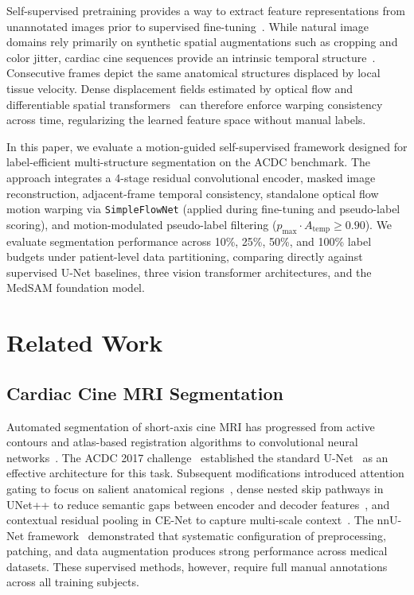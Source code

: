 \documentclass[pdflatex,sn-mathphys]{sn-jnl}
\theoremstyle{thmstyleone}
\theoremstyle{thmstyletwo}
\theoremstyle{thmstylethree}
\begin{document}
Self-supervised pretraining provides a way to extract feature representations from unannotated images prior to supervised fine-tuning~\cite{chen2020simple,he2022masked,chaitanya2020contrastive}. While natural image domains rely primarily on synthetic spatial augmentations such as cropping and color jitter, cardiac cine sequences provide an intrinsic temporal structure~\cite{bai2019self,morales2021self}. Consecutive frames depict the same anatomical structures displaced by local tissue velocity. Dense displacement fields estimated by optical flow and differentiable spatial transformers~\cite{dosovitskiy2015flownet,jaderberg2015spatial,balakrishnan2019voxelmorph} can therefore enforce warping consistency across time, regularizing the learned feature space without manual labels.

In this paper, we evaluate a motion-guided self-supervised framework designed for label-efficient multi-structure segmentation on the ACDC benchmark. The approach integrates a 4-stage residual convolutional encoder, masked image reconstruction, adjacent-frame temporal consistency, standalone optical flow motion warping via \texttt{SimpleFlowNet} (applied during fine-tuning and pseudo-label scoring), and motion-modulated pseudo-label filtering ($p_{\max} \cdot A_{\text{temp}} \ge 0.90$). We evaluate segmentation performance across 10\%, 25\%, 50\%, and 100\% label budgets under patient-level data partitioning, comparing directly against supervised U-Net baselines, three vision transformer architectures, and the MedSAM foundation model.

\section{Related Work}\label{sec:related}

\subsection{Cardiac Cine MRI Segmentation}
Automated segmentation of short-axis cine MRI has progressed from active contours and atlas-based registration algorithms to convolutional neural networks~\cite{petitjean2011review,chen2020deep}. The ACDC 2017 challenge~\cite{bernard2018deep} established the standard U-Net~\cite{ronneberger2015u} as an effective architecture for this task. Subsequent modifications introduced attention gating to focus on salient anatomical regions~\cite{oktay2018attention}, dense nested skip pathways in UNet++ to reduce semantic gaps between encoder and decoder features~\cite{zhou2018unetplus}, and contextual residual pooling in CE-Net to capture multi-scale context~\cite{gu2019cenet}. The nnU-Net framework~\cite{isensee2021nnu} demonstrated that systematic configuration of preprocessing, patching, and data augmentation produces strong performance across medical datasets. These supervised methods, however, require full manual annotations across all training subjects.
\end{document}
